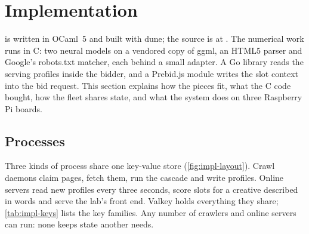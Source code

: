\section{Implementation}\label{sec:impl}

\sys{} is written in OCaml~5 and built with dune; the source is at \repo. The numerical work runs in C: two neural models on a vendored copy of ggml, an HTML5 parser and Google's robots.txt matcher, each behind a small adapter. A Go library reads the serving profiles inside the bidder, and a Prebid.js module writes the slot context into the bid request. This section explains how the pieces fit, what the C code bought, how the fleet shares state, and what the system does on three Raspberry Pi boards.

\subsection{Processes}\label{sec:impl-processes}

Three kinds of process share one key-value store (\cref{fig:impl-layout}). Crawl daemons claim pages, fetch them, run the cascade and write profiles. Online servers read new profiles every three seconds, score slots for a creative described in words and serve the lab's front end. Valkey holds everything they share; \cref{tab:impl-keys} lists the key families. Any number of crawlers and online servers can run: none keeps state another needs.

